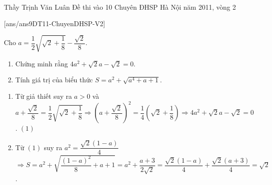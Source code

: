 \begin{name}
{Thầy  Trịnh Văn Luân}
{Đề thi vào 10 Chuyên ĐHSP Hà Nội năm 2011, vòng 2}
\end{name}
\setcounter{ex}{0}
[ans/ans9DT11-ChuyenDHSP-V2]
\begin{ex}%
Cho $a= \dfrac{1}{2} \sqrt{\sqrt{2}+\dfrac{1}{8}}- \dfrac{\sqrt{2}}{8}$.
    \hfill 
    \begin{enumerate}
        \item Chứng minh rằng $4a^2 + \sqrt{2}a- \sqrt{2}= 0$.
        \item Tính giá trị của biểu thức $S= a^2 + \sqrt{a^4+ a+1}$.
    \end{enumerate}
\loigiai
    {
    \begin{enumerate}
        \item Từ giả thiết suy ra $a>0$ và \\
        $a+ \dfrac{\sqrt{2}}{8}= \dfrac{1}{2} \sqrt{\sqrt{2}+\dfrac{1}{8}} \Rightarrow \left(a+ \dfrac{\sqrt{2}}{8}\right)^2= \dfrac{1}{4}\left(\sqrt{2}+ \dfrac{1}{8}\right)
        \Rightarrow 4a^2 + \sqrt{2}a- \sqrt{2}= 0$. $(1)$
        \item Từ $(1)$ suy ra $a^2= \dfrac{\sqrt{2}(1-a)}{4}$\\
        $\Rightarrow S= a^2+ \sqrt{\dfrac{(1-a)^2}{8}+ a +1}= a^2+ \dfrac{a+3}{2 \sqrt{2}}= \dfrac{\sqrt{2}(1-a)}{4}+ \dfrac{\sqrt{2}(a+3)}{4}= \sqrt{2}$.
    \end{enumerate}
    }
\end{ex}

